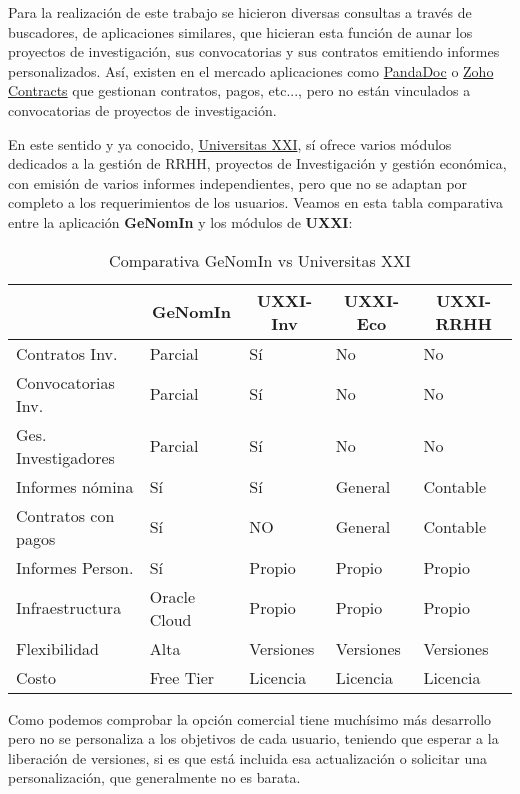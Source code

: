 Para la realización de este trabajo se hicieron diversas consultas a través de buscadores, de aplicaciones similares, que hicieran esta función de aunar los proyectos de investigación, sus convocatorias y sus contratos emitiendo informes personalizados.
Así, existen en el mercado aplicaciones como \href{https://www.pandadoc.com/}{PandaDoc} o \href{https://www.zoho.com/es-xl/contracts/?lb=es-xl}{Zoho Contracts} que gestionan contratos, pagos, etc..., pero no están vinculados a convocatorias de proyectos de investigación.

En este sentido y ya conocido,  \href{https://www.universitasxxi.com/}{Universitas XXI}, sí ofrece varios módulos dedicados a la gestión de RRHH, proyectos de Investigación y gestión económica, con emisión de varios informes independientes, pero que no se adaptan por completo a los requerimientos de los usuarios.
Veamos en esta tabla comparativa entre la aplicación \textbf{GeNomIn} y los módulos de \textbf{\acrshort{UXXI}}:

\begin{table}[h!]
	\centering
	\footnotesize
	\begin{tabular}{|l|l|l|l|l|}
		\hline
		\rowcolor{gray!20}
		\multicolumn{1}{c}{\textbf{Funcionalidad}\rule{0pt}{25pt}} & \multicolumn{1}{c}{\textbf{GeNomIn}} & \multicolumn{1}{c}{\textbf{UXXI-Inv}} &
		\multicolumn{1}{c}{\textbf{UXXI-Eco}} &
		\multicolumn{1}{c}{\textbf{UXXI-RRHH}} 
		\\
		\hline
		Contratos Inv. & Parcial & Sí & No & No\\
		Convocatorias Inv. & Parcial & Sí & No & No\\
		Ges. Investigadores & Parcial & Sí & No & No\\
		Informes nómina & Sí & Sí & General & Contable\\
		Contratos con pagos & Sí & NO & General & Contable\\
		Informes Person. & Sí & Propio & Propio & Propio\\
		Infraestructura & Oracle Cloud & Propio & Propio & Propio\\
		Flexibilidad & Alta & Versiones & Versiones & Versiones\\
		Costo & Free Tier & Licencia & Licencia & Licencia\\
		\hline
	\end{tabular}
	\caption{Comparativa GeNomIn vs Universitas XXI}
	\label{tab:comGenUniv}
\end{table}

Como podemos comprobar la opción comercial tiene muchísimo más desarrollo pero no se personaliza a los objetivos de cada usuario, teniendo que esperar a la liberación de versiones, si es que está incluida esa actualización o solicitar una personalización, que generalmente no es barata.